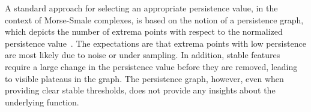 


A standard approach for selecting an appropriate persistence value, in the context of Morse-Smale complexes, is based on the notion of a persistence graph, which depicts the number of extrema points with respect to the normalized persistence value~\cite{pascucci07, Gerber10}.
The expectations are that extrema points with low persistence are most likely due to noise or under sampling. In addition, stable features require a large change in the persistence value before they are removed, leading to visible plateaus in the graph. The persistence graph, however, even when providing clear stable thresholds, does not provide any insights about the underlying function. 





